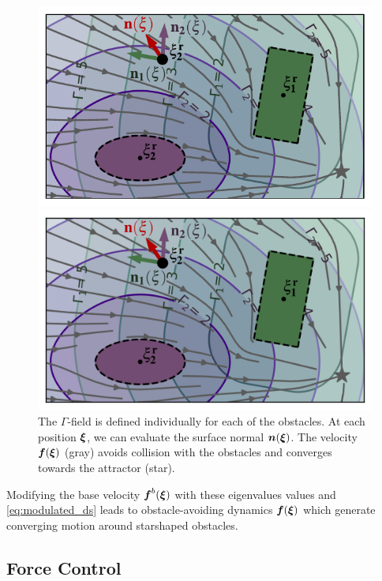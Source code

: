 \begin{figure}
\iflong
\centerline{\includegraphics[width=0.8\columnwidth]{figures/normal_and_gamma_field_visualization_annotated.pdf}}
\else
\centerline{\includegraphics[width=0.8\columnwidth]{figures/normal_and_gamma_field_visualization_annotated.png}}
\fi
\caption{
The $\Gamma$-field is defined individually for each of the obstacles. At each position $\boldsymbol{\xi}$, we can evaluate the surface normal $\boldsymbol{n}(\boldsymbol{\xi})$. 
The velocity $\boldsymbol{f}(\boldsymbol{\xi})$ (gray) avoids collision with the obstacles and converges towards the attractor (star).}
\label{fig:resultant_normal}
\end{figure}

\iflong
Modifying the base velocity $\boldsymbol{f}^b(\boldsymbol{\xi})$ with these eigenvalues values and \eqref{eq:modulated_ds} leads to obstacle-avoiding dynamics $\boldsymbol{f}(\boldsymbol{\xi})$ which generate converging motion around starshaped obstacles.
\fi

\subsection{Force Control}

